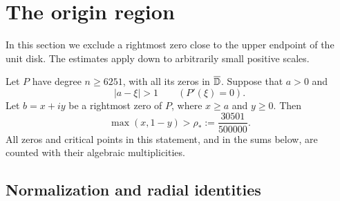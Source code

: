 \section{The origin region}\label{sec:origin}

In this section we exclude a rightmost zero close to the upper endpoint of
the unit disk.  The estimates apply down to arbitrarily small positive
scales.

\begin{proposition}\label{or:theorem}
Let $P$ have degree $n\ge6251$, with all its zeros in $\overline{\mathbb D}$.
Suppose that $a>0$ and
\[
             |a-\xi|>1\qquad(P'(\xi)=0).
\]
Let $b=x+iy$ be a rightmost zero of $P$, where $x\ge a$ and $y\ge0$.
Then
\begin{equation}\label{or:scale-conclusion}
       \max(x,1-y)>\rho_*:=\frac{30501}{500000}.
\end{equation}
All zeros and critical points in this statement, and in the sums below,
are counted with their algebraic multiplicities.
\end{proposition}

\subsection{Normalization and radial identities}


